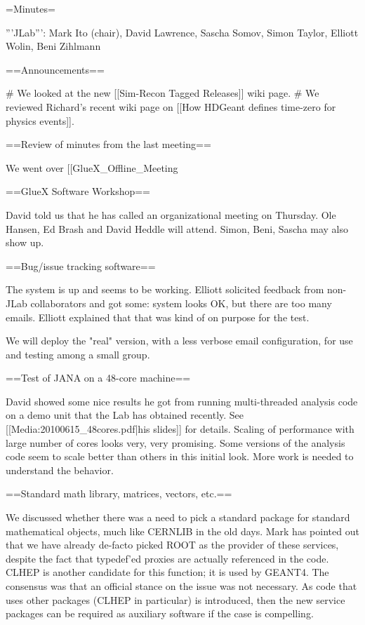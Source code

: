 =Minutes=

'''JLab''': Mark Ito (chair), David Lawrence, Sascha Somov, Simon Taylor, Elliott Wolin, Beni Zihlmann

==Announcements==

# We looked at the new [[Sim-Recon Tagged Releases]] wiki page.
# We reviewed Richard's recent wiki page on [[How HDGeant defines time-zero for physics events]].

==Review of minutes from the last meeting==

We went over [[GlueX_Offline_Meeting%

==GlueX Software Workshop==

David told us that he has called an organizational meeting on Thursday. Ole Hansen, Ed Brash and David Heddle will attend. Simon, Beni, Sascha may also show up.

==Bug/issue tracking software==

The system is up and seems to be working. Elliott solicited feedback from non-JLab collaborators and got some: system looks OK, but there are too many emails. Elliott explained that that was kind of on purpose for the test.

We will deploy the "real" version, with a less verbose email configuration, for use and testing among a small group.

==Test of JANA on a 48-core machine==

David showed some nice results he got from running multi-threaded analysis code on a demo unit that the Lab has obtained recently. See [[Media:20100615_48cores.pdf|his slides]] for details. Scaling of performance with large number of cores looks very, very promising. Some versions of the analysis code seem to scale better than others in this initial look. More work is needed to understand the behavior.

==Standard math library, matrices, vectors, etc.==

We discussed whether there was a need to pick a standard package for standard mathematical objects, much like CERNLIB in the old days. Mark has pointed out that we have already de-facto picked ROOT as the provider of these services, despite the fact that typedef'ed proxies are actually referenced in the code. CLHEP is another candidate for this function; it is used by GEANT4. The consensus was that an official stance on the issue was not necessary. As code that uses other packages (CLHEP in particular) is introduced, then the new service packages can be required as auxiliary software if the case is compelling.


